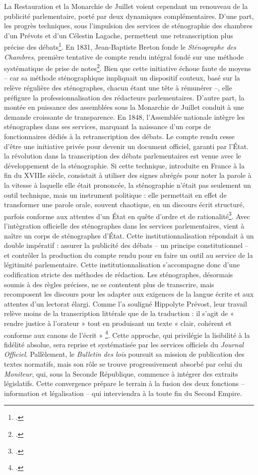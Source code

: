 La Restauration et la Monarchie de Juillet voient cependant un renouveau de la publicité parlementaire, porté par deux dynamiques complémentaires. D’une part, les progrès techniques, sous l'impulsion des services de sténographie des chambres d'un Prévots et d'un Célestin Lagache, permettent une retranscription plus précise des débats\footcite[][]{coniez}. En 1831, Jean-Baptiste Breton fonde le \emph{Sténographe des Chambres}, première tentative de compte rendu intégral fondé sur une méthode systématique de prise de notes\footcite[][]{coniez}. Bien que cette initiative échoue faute de moyens -- car sa méthode sténographique impliquait un dispositif couteux, basé sur la relève régulière des sténographes, chacun étant une tête à rémunérer --, elle préfigure la professionnalisation des rédacteurs parlementaires. D’autre part, la montée en puissance des assemblées sous la Monarchie de Juillet conduit à une demande croissante de transparence. En 1848, l’Assemblée nationale intègre les sténographes dans ses services, marquant la naissance d’un corps de fonctionnaires dédiés à la retranscription des débats. Le compte rendu cesse d’être une initiative privée pour devenir un document officiel, garanti par l’État. la révolution dans la transcription des débats parlementaires est venue avec le développement de la sténographie. Si cette technique, introduite en France à la fin du XVIIIe siècle, consistait à utiliser des signes abrégés pour noter la parole à la vitesse à laquelle elle était prononcée, la sténographie n’était pas seulement un outil technique, mais un instrument politique : elle permettait en effet de transformer une parole orale, souvent chaotique, en un discours écrit structuré, parfois conforme aux attentes d’un État en quête d’ordre et de rationalité\footcite[][]{morel}. Avec l'intègration officielle des sténographes dans les services parlementaires, vient à naître un corps de sténographes d’État. Cette institutionnalisation répondait à un double impératif : assurer la publicité des débats -- un principe constitutionnel -- et contrôler la production du compte rendu pour en faire un outil au service de la légitimité parlementaire.  Cette institutionnalisation s’accompagne donc d’une codification stricte des méthodes de rédaction. Les sténographes, désormais soumis à des règles précises, ne se contentent plus de transcrire, mais recomposent les discours pour les adapter aux exigences de la langue écrite et aux attentes d’un lectorat élargi. Comme l’a souligné Hippolyte Prévost, leur travail relève moins de la transcription littérale que de la traduction : il s’agit de « rendre justice à l’orateur » tout en produisant un texte « clair, cohérent et conforme aux canons de l’écrit » \footcite[][]{morel}. Cette approche, qui privilégie la lisibilité à la fidélité absolue, sera reprise et systématisée par les services officiels du \emph{Journal Officiel}. Pallèlement, le \emph{Bulletin des lois} poursuit sa mission de publication des textes normatifs, mais son rôle se trouve progressivement absorbé par celui du \emph{Moniteur}, qui, sous la Seconde République, commence à intégrer des extraits législatifs. Cette convergence prépare le terrain à la fusion des deux fonctions – information et légalisation – qui interviendra à la toute fin du Second Empire.

